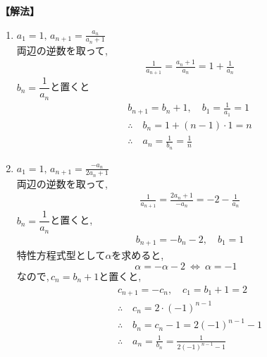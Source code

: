     \noindent\textbf{【解法】}
    \begin{enumerate}[label=(\arabic*),parsep=3pt]
      \item $\displaystyle a_1=1,\, a_{n+1}=\frac{a_n}{a_n+1}$\\
            両辺の逆数を取って,
            \begin{align*}
              &\frac{1}{a_{n+1}}=\frac{a_n+1}{a_n}=1+\frac{1}{a_n}
            \end{align*}
            $b_n=\dfrac{1}{a_n}$と置くと
            \begin{align*}
              &b_{n+1}=b_n+1,\quad b_1=\frac{1}{a_1}=1\\
              &\therefore \quad b_n=1+(n-1)\cdot1=n\\
              &\therefore \quad a_n=\frac{1}{b_n}=\frac{1}{n}
            \end{align*}
      \item $\displaystyle a_1=1,\, a_{n+1}=\frac{-a_n}{2a_n+1}$\\
            両辺の逆数を取って,
            \begin{align*}
              &\frac{1}{a_{n+1}}=\frac{2a_n+1}{-a_n}=-2-\frac{1}{a_n}
            \end{align*}
            $b_n=\dfrac{1}{a_n}$と置くと,
            \begin{align*}
              &b_{n+1}=-b_n-2,\quad b_1=1
            \end{align*}
            特性方程式型として$\alpha$を求めると,
            \[
              \alpha=-\alpha-2 \ \Leftrightarrow\ \alpha=-1
            \]
            なので,\,$c_n=b_n+1$と置くと,
            \begin{align*}
              &c_{n+1}=-c_n,\quad c_1=b_1+1=2\\
              &\therefore \quad c_n=2\cdot(-1)^{n-1}\\
              &\therefore \quad b_n=c_n-1=2(-1)^{n-1}-1\\
              &\therefore \quad a_n=\frac{1}{b_n}=\frac{1}{2(-1)^{n-1}-1}
            \end{align*}
    \end{enumerate}
